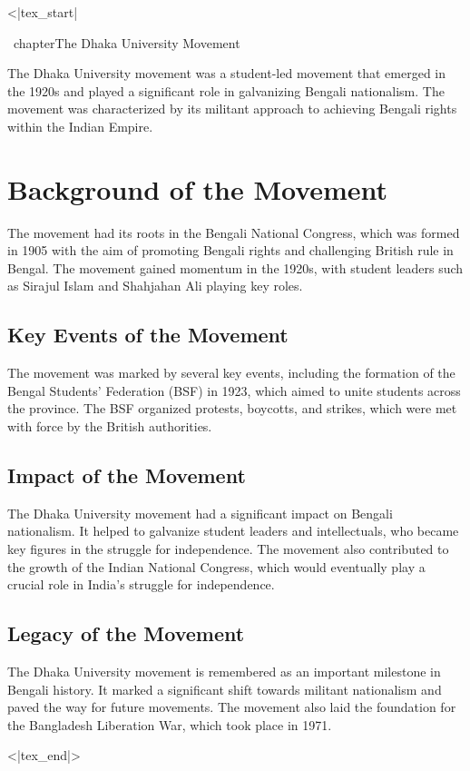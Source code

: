 <|tex_start|

\ chapter{The Dhaka University Movement}

The Dhaka University movement was a student-led movement that emerged in the 1920s and played a significant role in galvanizing Bengali nationalism. The movement was characterized by its militant approach to achieving Bengali rights within the Indian Empire.

\section{Background of the Movement}

The movement had its roots in the Bengali National Congress, which was formed in 1905 with the aim of promoting Bengali rights and challenging British rule in Bengal. The movement gained momentum in the 1920s, with student leaders such as Sirajul Islam and Shahjahan Ali playing key roles.

\subsection{Key Events of the Movement}

The movement was marked by several key events, including the formation of the Bengal Students' Federation (BSF) in 1923, which aimed to unite students across the province. The BSF organized protests, boycotts, and strikes, which were met with force by the British authorities.

\subsection{Impact of the Movement}

The Dhaka University movement had a significant impact on Bengali nationalism. It helped to galvanize student leaders and intellectuals, who became key figures in the struggle for independence. The movement also contributed to the growth of the Indian National Congress, which would eventually play a crucial role in India's struggle for independence.

\subsection{Legacy of the Movement}

The Dhaka University movement is remembered as an important milestone in Bengali history. It marked a significant shift towards militant nationalism and paved the way for future movements. The movement also laid the foundation for the Bangladesh Liberation War, which took place in 1971.

<|tex_end|>